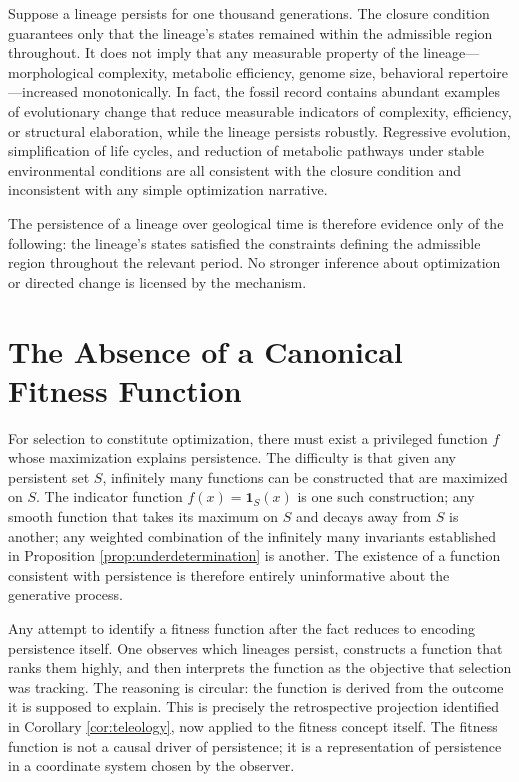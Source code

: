 \documentclass[12pt, a4paper, oneside]{article}
\theoremstyle{plain}
\theoremstyle{definition}
\theoremstyle{remark}
\begin{document}
Suppose a lineage persists for one thousand generations. The closure condition guarantees only that the lineage's states remained within the admissible region throughout. It does not imply that any measurable property of the lineage---morphological complexity, metabolic efficiency, genome size, behavioral repertoire---increased monotonically. In fact, the fossil record contains abundant examples of evolutionary change that reduce measurable indicators of complexity, efficiency, or structural elaboration, while the lineage persists robustly. Regressive evolution, simplification of life cycles, and reduction of metabolic pathways under stable environmental conditions are all consistent with the closure condition and inconsistent with any simple optimization narrative.

The persistence of a lineage over geological time is therefore evidence only of the following: the lineage's states satisfied the constraints defining the admissible region throughout the relevant period. No stronger inference about optimization or directed change is licensed by the mechanism.

\section{The Absence of a Canonical Fitness Function}

For selection to constitute optimization, there must exist a privileged function $f$ whose maximization explains persistence. The difficulty is that given any persistent set $S$, infinitely many functions can be constructed that are maximized on $S$. The indicator function $f(x) = \mathbf{1}_S(x)$ is one such construction; any smooth function that takes its maximum on $S$ and decays away from $S$ is another; any weighted combination of the infinitely many invariants established in Proposition \ref{prop:underdetermination} is another. The existence of a function consistent with persistence is therefore entirely uninformative about the generative process.

Any attempt to identify a fitness function after the fact reduces to encoding persistence itself. One observes which lineages persist, constructs a function that ranks them highly, and then interprets the function as the objective that selection was tracking. The reasoning is circular: the function is derived from the outcome it is supposed to explain. This is precisely the retrospective projection identified in Corollary \ref{cor:teleology}, now applied to the fitness concept itself. The fitness function is not a causal driver of persistence; it is a representation of persistence in a coordinate system chosen by the observer.
\end{document}

